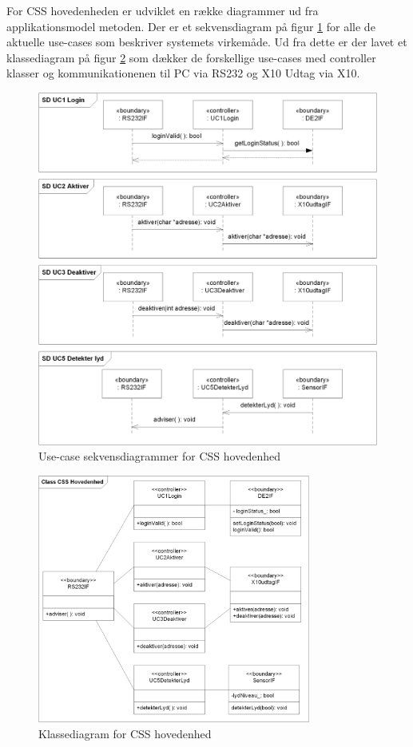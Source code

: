 For CSS hovedenheden er udviklet en række diagrammer ud fra applikationsmodel metoden.
Der er et sekvensdiagram på figur \ref{fig:CSS_hovedenhed_SD} for alle de aktuelle use-cases som beskriver systemets virkemåde.
Ud fra dette er der lavet et klassediagram på figur \ref{fig:CSS_hovedenhed_Class} som dækker de forskellige use-cases med controller klasser og kommunikationenen til PC via RS232 og X10 Udtag via X10.


\begin{figure}[!htb]
	\includegraphics[width=\textwidth]{billeder/uml/CSS_hovedenhed_SD}
     \caption{Use-case sekvensdiagrammer for CSS hovedenhed}
     \label{fig:CSS_hovedenhed_SD}
\end{figure}

\begin{figure}[!htb] \centering
     \includegraphics[width=0.8\textwidth]{billeder/uml/CSS_hovedenhed_Class}
     \caption{Klassediagram for CSS hovedenhed}
     \label{fig:CSS_hovedenhed_Class}
\end{figure}


